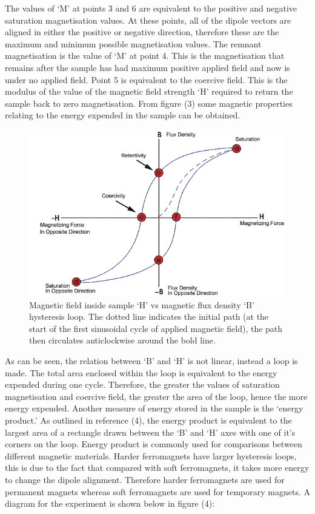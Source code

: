 \documentclass[a4paper]{article}\usepackage[english]{babel}
\begin{document}
The values of ‘M’ at points 3 and 6 are equivalent to the positive and negative saturation magnetisation values. At these points, all of the dipole vectors are aligned in either the positive or negative direction, therefore these are the maximum and minimum possible magnetisation values.  The remnant magnetisation is the value of ‘M’ at point 4. This is the magnetisation that remains after the sample has had maximum positive applied field and now is under no applied field. Point 5 is equivalent to the coercive field. This is the modulus of the value of the magnetic field strength ‘H’ required to return the sample back to zero magnetisation.
From figure (3) some magnetic properties relating to the energy expended in the sample can be obtained. 

\begin{figure}[!h]
\includegraphics[width=\linewidth]{picture3.png}
\caption{\label{fig:picture3} Magnetic field inside sample ‘H’ vs magnetic flux density ‘B’ hysteresis loop. The dotted line indicates the initial path (at the start of the first sinusoidal cycle of applied magnetic field), the path then circulates anticlockwise around the bold line. }
\end{figure}
\FloatBarrier
As can be seen, the relation between ‘B’ and ‘H’ is not linear, instead a loop is made. The total area enclosed within the loop is equivalent to the energy expended during one cycle. Therefore, the greater the values of saturation magnetisation and coercive field, the greater the area of the loop, hence the more energy expended. Another measure of energy stored in the sample is the ‘energy product.’ As outlined in reference (4), the energy product is equivalent to the largest area of a rectangle drawn between the ‘B’ and ‘H’ axes with one of it’s corners on the loop. Energy product is commonly used for comparisons between different magnetic materials.
Harder ferromagnets have larger hysteresis loops, this is due to the fact that compared with soft ferromagnets, it takes more energy to change the dipole alignment. Therefore harder ferromagnets are used for permanent magnets whereas soft ferromagnets are used for temporary magnets.
A diagram for the experiment is shown below in figure (4):
\end{document}
